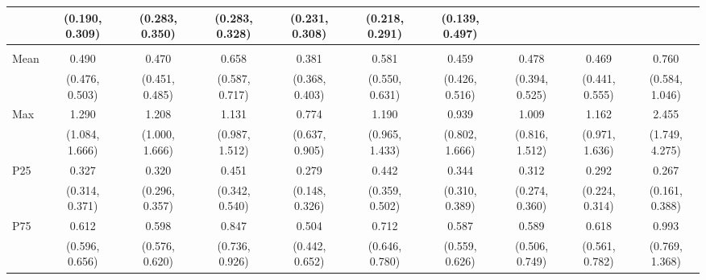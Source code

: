{\begin{tabular}{l|c|c|c|c|c|c|c|c|c}
& {\scriptsize (0.190, 0.309)}
& {\scriptsize (0.283, 0.350)}
& {\scriptsize (0.283, 0.328)}
& {\scriptsize (0.231, 0.308)}
& {\scriptsize (0.218, 0.291)}
& {\scriptsize (0.139, 0.497)}
\\ [0.1cm]
\hline
\noalign{\smallskip}
\multicolumn{10}{l}{\textbf{Effect with Leads and Lags}} \\
\noalign{\smallskip}
\hline
Mean
& 0.490 & 0.470 & 0.658 & 0.381 & 0.581 & 0.459 & 0.478 & 0.469 & 0.760 \\
& {\scriptsize (0.476, 0.503)}
& {\scriptsize (0.451, 0.485)}
& {\scriptsize (0.587, 0.717)}
& {\scriptsize (0.368, 0.403)}
& {\scriptsize (0.550, 0.631)}
& {\scriptsize (0.426, 0.516)}
& {\scriptsize (0.394, 0.525)}
& {\scriptsize (0.441, 0.555)}
& {\scriptsize (0.584, 1.046)}
\\ [0.1cm]
\hline
Max
& 1.290 & 1.208 & 1.131 & 0.774 & 1.190 & 0.939 & 1.009 & 1.162 & 2.455 \\
& {\scriptsize (1.084, 1.666)}
& {\scriptsize (1.000, 1.666)}
& {\scriptsize (0.987, 1.512)}
& {\scriptsize (0.637, 0.905)}
& {\scriptsize (0.965, 1.433)}
& {\scriptsize (0.802, 1.666)}
& {\scriptsize (0.816, 1.512)}
& {\scriptsize (0.971, 1.636)}
& {\scriptsize (1.749, 4.275)}
\\ [0.1cm]
\hline
P25
& 0.327 & 0.320 & 0.451 & 0.279 & 0.442 & 0.344 & 0.312 & 0.292 & 0.267 \\
& {\scriptsize (0.314, 0.371)}
& {\scriptsize (0.296, 0.357)}
& {\scriptsize (0.342, 0.540)}
& {\scriptsize (0.148, 0.326)}
& {\scriptsize (0.359, 0.502)}
& {\scriptsize (0.310, 0.389)}
& {\scriptsize (0.274, 0.360)}
& {\scriptsize (0.224, 0.314)}
& {\scriptsize (0.161, 0.388)}
\\ [0.1cm]
\hline
P75
& 0.612 & 0.598 & 0.847 & 0.504 & 0.712 & 0.587 & 0.589 & 0.618 & 0.993 \\
& {\scriptsize (0.596, 0.656)}
& {\scriptsize (0.576, 0.620)}
& {\scriptsize (0.736, 0.926)}
& {\scriptsize (0.442, 0.652)}
& {\scriptsize (0.646, 0.780)}
& {\scriptsize (0.559, 0.626)}
& {\scriptsize (0.506, 0.749)}
& {\scriptsize (0.561, 0.782)}
& {\scriptsize (0.769, 1.368)}
\\ [0.1cm]
\hline
\hline
\end{tabular}
}
